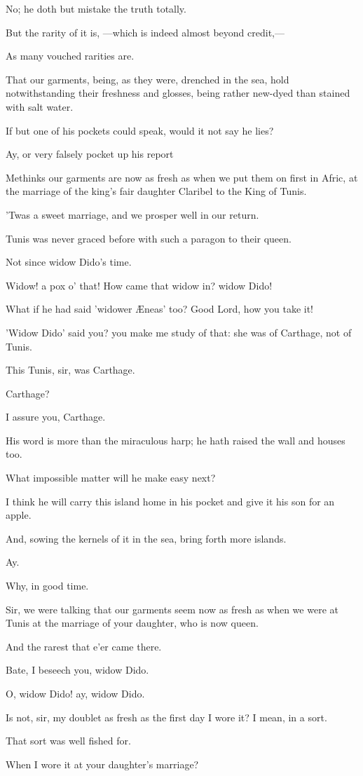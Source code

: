 \documentclass[11pt]{book}
\begin{document}
\begin{PROSE}
\8	No; he doth but mistake the truth totally.

\9	But the rarity of it is, ---which is indeed almost
	be\-yond credit,---

\8	As many vouched rarities are.

\9	That our garments, being, as they were, drenched in
	the sea, hold notwithstanding their freshness and
	glosses, being rather new-dyed than stained with
	salt water.

\7	If but one of his pockets could speak, would it not
	say he lies?

\8	Ay, or very falsely pocket up his report

\9	Methinks our garments are now as fresh as when we
	put them on first in Afric, at the marriage of
	the king's fair daughter Claribel to the King of Tunis.

\8	'Twas a sweet marriage, and we prosper well in our return.

	Tunis was never graced before with such a paragon to
	their queen.

\9	Not since widow Dido's time.

\7	Widow! a pox o' that! How came that widow in?
	widow Dido!

\8	What if he had said 'widower \AE{}neas' too? Good Lord,
	how you take it!

	'Widow Dido' said you? you make me study of that:
	she was of Carthage, not of Tunis.

\9	This Tunis, sir, was Carthage.

	Carthage?

\9	I assure you, Carthage.

\8	His word is more than the miraculous harp; he hath
	raised the wall and houses too.

\7	What impossible matter will he make easy next?

\8	I think he will carry this island home in his pocket
	and give it his son for an apple.

\7	And, sowing the kernels of it in the sea, bring
	forth more islands.

\9	Ay.

\7	Why, in good time.

\9	Sir, we were talking that our garments seem now
	as fresh as when we were at Tunis at the marriage
	of your daughter, who is now queen.

\7	And the rarest that e'er came there.

\8	Bate, I beseech you, widow Dido.

\7	O, widow Dido! ay, widow Dido.

\9	Is not, sir, my doublet as fresh as the first day I
	wore it? I mean, in a sort.

\7	That sort was well fished for.

\9	When I wore it at your daughter's marriage?

\end{PROSE}
\end{document}
